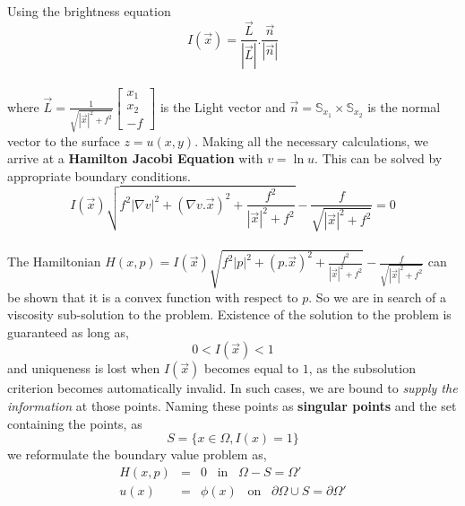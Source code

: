 \documentclass[11pt]{report}
\begin{document}
	\\
	Using the brightness equation
	\begin{equation}
		I(\vec{x}) = \frac{\vec{L}}{|\vec{L}|} . \frac{\vec{n}}{|\vec{n}|}
	\end{equation}
	 \\
	 where $\vec{L} = \frac{1}{\sqrt{|\vec{x}|^2+f^2}}\begin{bmatrix}
	 x_1\\
	 x_2\\
	 -f
	 \end{bmatrix}$ is the Light vector and $\vec{n} = \mathbb{S}_{x_1} \times \mathbb{S}_{x_2}$ is the normal vector to the surface $z=u(x,y)$. Making all the necessary calculations, we arrive at a \textbf{Hamilton Jacobi Equation} with $v = \ln u$. This can be solved by appropriate boundary conditions.
	 \begin{equation}
	 	I(\vec{x})\sqrt{f^2|\nabla v|^2 + (\nabla v. \vec{x})^2 + \frac{f^2}{|\vec{x}|^2+f^2}} - \frac{f}{\sqrt{|\vec{x}|^2+f^2}} = 0 \label{eq:1}
	 \end{equation}
	 \\
	 The Hamiltonian $H(x,p) = I(\vec{x})\sqrt{f^2|p|^2 + (p. \vec{x})^2 + \frac{f^2}{|\vec{x}|^2+f^2}} - \frac{f}{\sqrt{|\vec{x}|^2+f^2}}$ can be shown that it is a convex function with respect to $p$. So we are in search of a viscosity sub-solution to the problem. Existence of the solution to the problem is guaranteed as long as,
	 \begin{equation}
	 	0 < I(\vec{x}) < 1
	 \end{equation}
	 and uniqueness is lost when $I(\vec{x})$ becomes equal to $1$, as the subsolution criterion becomes automatically invalid. In such cases, we are bound to \textit{supply the information} at those points. Naming these points as \textbf{singular points} and the set containing the points, as 
	 \begin{equation}
		 S = \{x\in\Omega , I(x) = 1\}
	 \end{equation}
	 we reformulate the boundary value problem as,
	 \begin{eqnarray}
	 	H(x,p) &=& 0 \;\;\; \text{in} \;\;\; \Omega - S = {\Omega}' \\
	 	u(x) &=& \phi(x) \;\;\; \text{on} \;\;\; \partial \Omega \cup S = \partial \Omega'
	 \end{eqnarray}
	 
\end{document}
